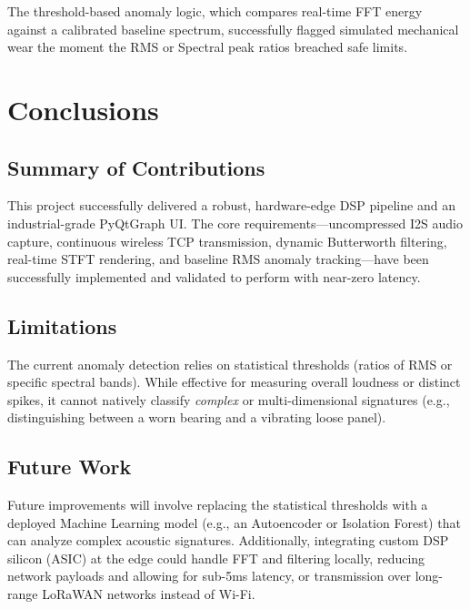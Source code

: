 \documentclass[11pt,a4paper]{article}
\begin{document}
The threshold-based anomaly logic, which compares real-time FFT energy against a calibrated baseline spectrum, successfully flagged simulated mechanical wear the moment the RMS or Spectral peak ratios breached safe limits.

\section{Conclusions}

\subsection{Summary of Contributions}
This project successfully delivered a robust, hardware-edge DSP pipeline and an industrial-grade PyQtGraph UI. The core requirements---uncompressed I2S audio capture, continuous wireless TCP transmission, dynamic Butterworth filtering, real-time STFT rendering, and baseline RMS anomaly tracking---have been successfully implemented and validated to perform with near-zero latency.

\subsection{Limitations}
The current anomaly detection relies on statistical thresholds (ratios of RMS or specific spectral bands). While effective for measuring overall loudness or distinct spikes, it cannot natively classify \textit{complex} or multi-dimensional signatures (e.g., distinguishing between a worn bearing and a vibrating loose panel).

\subsection{Future Work}
Future improvements will involve replacing the statistical thresholds with a deployed Machine Learning model (e.g., an Autoencoder or Isolation Forest) that can analyze complex acoustic signatures. Additionally, integrating custom DSP silicon (ASIC) at the edge could handle FFT and filtering locally, reducing network payloads and allowing for sub-5ms latency, or transmission over long-range LoRaWAN networks instead of Wi-Fi.
\end{document}
